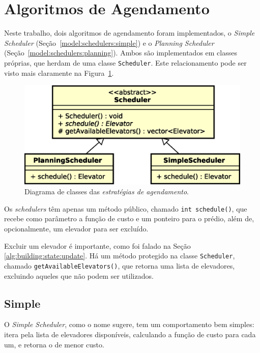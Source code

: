 \section{\label{model:schedulers}Algoritmos de Agendamento}

Neste trabalho, dois algoritmos de agendamento foram implementados, o
\textit{Simple Scheduler} (Seção~\ref{model:schedulers:simple}) e o
\textit{Planning Scheduler} (Seção~\ref{model:schedulers:planning}). Ambos são
implementados em classes próprias, que herdam de uma classe \texttt{Scheduler}.
Este relacionamento pode ser visto mais claramente na
Figura~\ref{fig:model:schedulers:uml:base}.

\begin{figure}[htb!]
  \centering
  \includegraphics[scale=0.6]{img/Scheduler}
  \caption{Diagrama de classes das \textit{estratégias de agendamento}.}
  \label{fig:model:schedulers:uml:base}
\end{figure}

Os \textit{schedulers} têm apenas um método público, chamado \texttt{int
 schedule()}, que recebe como parâmetro a função de custo e um ponteiro para o
prédio, além de, opcionalmente, um elevador para ser excluído.

Excluir um elevador é importante, como foi falado na Seção
\ref{alg:building:state:update}. Há um método protegido na classe
\texttt{Scheduler}, chamado \texttt{getAvailableElevators()}, que retorna uma
lista de elevadores, excluindo aqueles que não podem ser utilizados.

\subsection{\label{model:schedulers:simple}Simple}
O \textit{Simple Scheduler}, como o nome sugere, tem um comportamento bem
simples: itera pela lista de elevadores disponíveis, calculando a função de
custo para cada um, e retorna o de menor custo.

